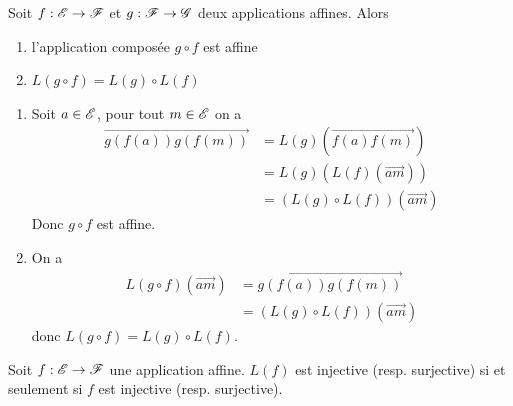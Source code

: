 \documentclass[a4paper, 12pt]{article}
\begin{document}
\begin{proposition}{}{}
    Soit $f: \mathscr{E} \to \mathscr{F}$ et $g: \mathscr{F} \to \mathscr{G}$ deux applications affines.
    Alors
    \begin{enumerate}
        \item l'application composée $g \circ f$ est affine
        \item $L(g \circ f) = L(g) \circ L(f)$
    \end{enumerate}
\end{proposition}

\begin{demonstration}
    \begin{enumerate}
        \item Soit $a \in \mathscr{E}$, pour tout $m \in \mathscr{E}$ on a
        \begin{align*}
            \overrightarrow{g(f(a)) g(f(m))} &= L(g)(\overrightarrow{f(a) f(m)}) \\
            &= L(g)(L(f)(\overrightarrow{am})) \\
            &= (L(g) \circ L(f))(\overrightarrow{am})
        \end{align*}
        Donc $g \circ f$ est affine.
        \item On a
        \begin{align*}
            L(g \circ f)(\overrightarrow{am}) &= \overrightarrow{g(f(a)) g(f(m))} \\
            &= (L(g) \circ L(f))(\overrightarrow{am})
        \end{align*}
        donc $L(g \circ f) = L(g) \circ L(f)$.
    \end{enumerate}
\end{demonstration}

\begin{proposition}{}{}
    Soit $f: \mathscr{E} \to \mathscr{F}$ une application affine.
    $L(f)$ est injective (resp. surjective) si et seulement si $f$ est injective (resp. surjective).
\end{proposition}
\end{document}

